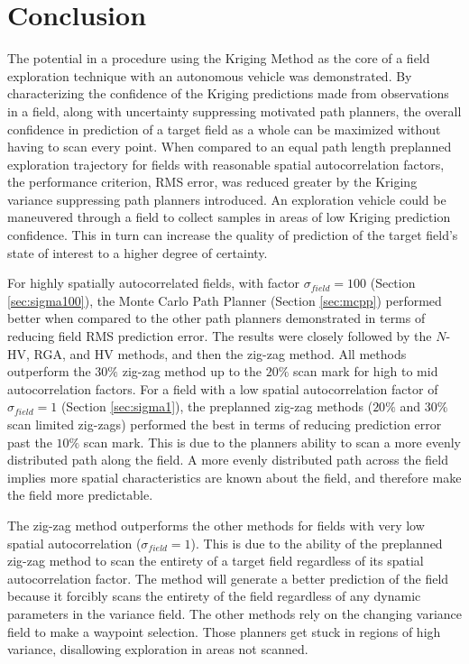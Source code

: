 \chapter{Conclusion}
The potential in a procedure using the Kriging Method as the core of a field exploration technique with an autonomous vehicle was demonstrated. By characterizing the confidence of the Kriging predictions made from observations in a field, along with uncertainty suppressing motivated path planners, the overall confidence in prediction of a target field as a whole can be maximized without having to scan every point. When compared to an equal path length preplanned exploration trajectory for fields with reasonable spatial autocorrelation factors, the performance criterion, RMS error, was reduced greater by the Kriging variance suppressing path planners introduced. An exploration vehicle could be maneuvered through a field to collect samples in areas of low Kriging prediction confidence. This in turn can increase the quality of prediction of the target field's state of interest to a higher degree of certainty.

For highly spatially autocorrelated fields, with factor $\sigma_{field} = 100$ (Section \ref{sec:sigma100}), the Monte Carlo Path Planner (Section \ref{sec:mcpp}) performed better when compared to the other path planners demonstrated in terms of reducing field RMS prediction error. The results were closely followed by the $N$-HV, RGA, and HV methods, and then the zig-zag method. All methods outperform the $30\%$ zig-zag method up to the $20\%$ scan mark for high to mid autocorrelation factors. For a field with a low spatial autocorrelation factor of $\sigma_{field} = 1$ (Section \ref{sec:sigma1}), the preplanned zig-zag methods ($20\%$ and $30\%$ scan limited zig-zags) performed the best in terms of reducing prediction error past the $10\%$ scan mark. This is due to the planners ability to scan a more evenly distributed path along the field. A more evenly distributed path across the field implies more spatial characteristics are known about the field, and therefore make the field more predictable.

The zig-zag method outperforms the other methods for fields with very low spatial autocorrelation ($\sigma_{field} = 1$). This is due to the ability of the preplanned zig-zag method to scan the entirety of a target field regardless of its spatial autocorrelation factor. The method will generate a better prediction of the field because it forcibly scans the entirety of the field regardless of any dynamic parameters in the variance field. The other methods rely on the changing variance field to make a waypoint selection. Those planners get stuck in regions of high variance, disallowing exploration in areas not scanned.

